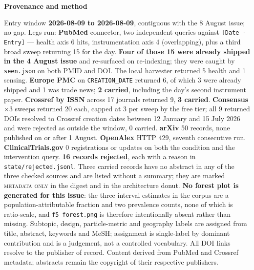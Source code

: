 \documentclass[10pt]{article}
\begin{document}
\vspace{4mm}
\begin{keybox}
{\sffamily\bfseries\footnotesize\color{Deep}Provenance and method}\\[1.2mm]
{\fontsize{7.2}{8.8}\selectfont
Entry window \textbf{2026-08-09 to 2026-08-09}, contiguous with the 8 August issue; no
gap. Legs run: \textbf{PubMed} connector, two independent queries against
\texttt{[Date - Entry]} --- health axis 6 hits, instrumentation axis 4 (overlapping),
plus a third broad sweep returning 15 for the day. \textbf{Four of those 15 were already
shipped in the 4 August issue} and re-surfaced on re-indexing; they were caught by
\texttt{seen.json} on both PMID and DOI. The local harvester returned 5 health and
1 sensing. \textbf{Europe PMC} on \texttt{CREATION\_DATE} returned 6, of which 3 were
already shipped and 1 was trade news; \textbf{2 carried}, including the day's second
instrument paper. \textbf{Crossref by ISSN} across 17 journals returned 9, \textbf{3
carried}. \textbf{Consensus} $\times$3 sweeps returned 20 each, capped at 3 per sweep by
the free tier; all 9 returned DOIs resolved to Crossref creation dates between 12 January
and 15 July 2026 and were rejected as outside the window, 0 carried. \textbf{arXiv}
50 records, none published on or after 1 August. \textbf{OpenAlex} HTTP 429, seventh
consecutive run. \textbf{ClinicalTrials.gov} 0 registrations or updates on both the
condition and the intervention query.
\textbf{16 records rejected}, each with a reason in \texttt{state/rejected.jsonl}.
Three carried records have no abstract in any of the three checked sources and are
listed without a summary; they are marked \textsc{metadata only} in the digest and in
the architecture donut.
\textbf{No forest plot is generated for this issue}: the three interval estimates in the
corpus are a population-attributable fraction and two prevalence counts, none of which is
ratio-scale, and \texttt{f5\_forest.png} is therefore intentionally absent rather than
missing.
Subtopic, design, particle-metric and geography labels are assigned from title, abstract,
keywords and MeSH; assignment is single-label by dominant contribution and is a
judgement, not a controlled vocabulary.
All DOI links resolve to the publisher of record. Content derived from PubMed and
Crossref metadata; abstracts remain the copyright of their respective publishers.\par}
\end{keybox}
\end{document}
